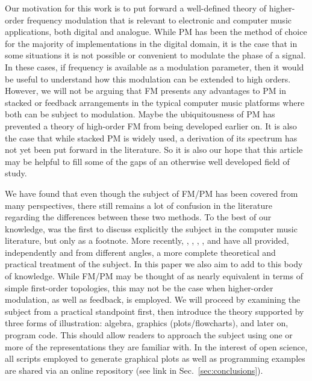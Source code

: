 \documentclass[]{interact}
\begin{document}
Our motivation for this work is to put forward a well-defined theory of higher-order frequency modulation that is relevant to electronic and computer music applications, both digital and analogue. While PM has been the method of choice for the majority of implementations in the digital domain, it is the case that in some situations it is not possible or convenient to modulate the phase of a signal. In these cases, if frequency is available as a modulation parameter, then it would be useful to understand how this modulation can be extended to high orders. However, we will not be arguing that FM presents any advantages to PM in stacked or feedback arrangements in the typical computer music platforms where both can be subject to modulation. Maybe the ubiquitousness of PM has prevented a theory of high-order FM from being developed earlier on. It is also the case that while stacked PM is widely used, a derivation of its spectrum has not yet been put forward in the literature. So it is also our hope that this article may be helpful to fill some of the gaps of an otherwise well developed field of study.

We have found that even though the subject of FM/PM has been covered from many perspectives, there still remains a lot of confusion in the literature regarding the differences between these two methods. To the best of our knowledge, \cite{Moore:1990} was the first to discuss explicitly the subject in the computer music literature, but only as a footnote. More recently, \cite{Lazzarini2021}, \cite{LazzariniTimoney2021}, \cite{Nielsen}, \cite{Loopback}, and \cite{Hsu} have all provided, independently and from different angles, a more complete theoretical and practical treatment of the subject. In this paper we also aim to add to this body of knowledge. While FM/PM may be thought of as nearly equivalent in terms of simple first-order topologies, this may not be the case when higher-order modulation, as well as feedback, is employed. We will proceed by examining the subject from a practical standpoint first, then introduce the theory supported by three forms of illustration: algebra, graphics (plots/flowcharts), and later on, program code. This should allow readers to approach the subject using one or more of the representations they are familiar with. In the interest of open science, all scripts employed to generate graphical plots as well as programming examples are shared via an online repository (see link in Sec.~\ref{sec:conclusions}).
\end{document}
